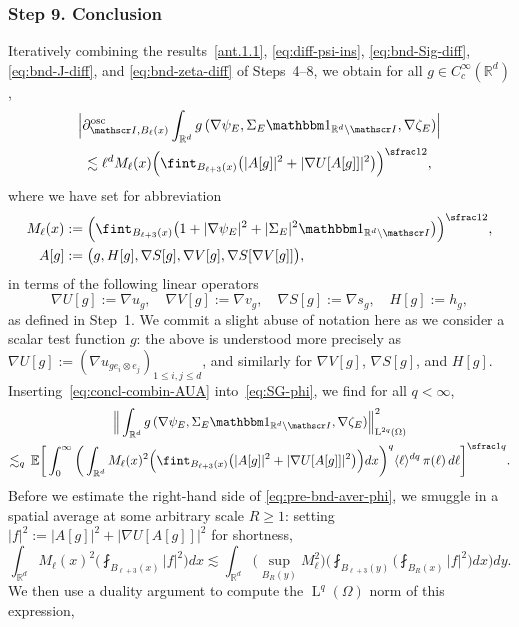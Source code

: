 \documentclass[10pt]{amsart}
\let\mathcal\mathscr
\let\mathds\mathbbm
\theoremstyle{plain}
\theoremstyle{definition}
\newcommand{\R}{\mathbb R}
\newcommand{\Ic}{\mathcal I}
\newcommand{\ee}{e}
\newcommand{\Ld}{\operatorname{L}}
\newcommand{\step}[1]{\subsubsection*{Step #1}}
\newcommand{\E}{\mathbb{E}}
\begin{document}
\step{9. Conclusion}
Iteratively combining the results~\eqref{ant.1.1}, \eqref{eq:diff-psi-ins}, \eqref{eq:bnd-Sig-diff}, \eqref{eq:bnd-J-diff}, and \eqref{eq:bnd-zeta-diff} of Steps~4--8,
we obtain for all $g\in C^\infty_c(\R^d)$,
\begin{multline}\label{eq:concl-combin-AUA}
\Big|\partial^{\operatorname{osc}}_{\Ic ,B_\ell(x)}\int_{\R^d}g\,(\nabla \psi_E,\Sigma_E\mathds1_{\R^d\setminus\Ic},\nabla\zeta_E)\Big|\\
\lesssim \ell^dM_\ell(x)\Big(\fint_{B_{\ell+3}(x)}\big(|A[g]|^2+|\nabla U [A[g]]|^2\big)\Big)^{\sfrac12},
\end{multline}
where we have set for abbreviation
\begin{align*}
M_\ell(x)&:= \Big(\fint_{B_{\ell+3}(x)}\big(1+|\nabla\psi_E|^2+|\Sigma_E|^2\mathds1_{\R^d\setminus\Ic}\big)\Big)^{\sfrac12},\\
A[g]&:= \big(g,H[g],\nabla S[g],\nabla V[g],\nabla S[\nabla V[g]]\big),
\end{align*}
in terms of the following linear operators
\[\nabla U[g]:=\nabla u_g,\quad \nabla V[g]:=\nabla v_g,\quad \nabla S[g]:=\nabla s_g,\quad H[g]:=h_g,\]
as defined in Step~1. We commit a slight abuse of notation here as we consider a scalar test function $g$: the above is understood more precisely as $\nabla U[g]:=(\nabla u_{g\ee_i\otimes\ee_j})_{1\le i,j\le d}$, and similarly for $\nabla V[g]$, $\nabla S[g]$, and $H[g]$.
Inserting~\eqref{eq:concl-combin-AUA} into~\eqref{eq:SG-phi}, we find for all $q<\infty$,
\begin{multline}\label{eq:pre-bnd-aver-phi}
\Big\|\int_{\R^d}g\,(\nabla \psi_E,\Sigma_E\mathds1_{\R^d\setminus\Ic},\nabla\zeta_E)\Big\|_{\Ld^{2q}(\Omega)}^{2}\\
\lesssim_q \,\E\bigg[\int_0^\infty\bigg(\int_{\R^d}M_\ell(x)^2\Big(\fint_{B_{\ell+3}(x)}\big(|A[g]|^2+|\nabla U [A[g]]|^2\big)\Big)dx\bigg)^q\langle\ell\rangle^{dq}\,\pi(\ell)\,d\ell\bigg]^{\sfrac1q}.
\end{multline}
Before we estimate the right-hand side of \eqref{eq:pre-bnd-aver-phi}, we smuggle in a spatial average at some arbitrary scale $R\ge1$: setting $|f|^2:=|A[g]|^2+|\nabla U [A[g]]|^2$ for shortness,
\begin{equation*}
\int_{\R^d}M_\ell(x)^2\Big(\fint_{B_{\ell+3}(x)} |f|^2\Big)dx
\lesssim \int_{\R^d}\Big(\sup_{B_R(y)}M_\ell^2\Big)\bigg(\fint_{B_{\ell+3}(y)}\Big(\fint_{B_{R}(x)}|f|^2\Big)dx\bigg)dy.
\end{equation*}
We then use a duality argument to compute the $\Ld^q(\Omega)$ norm of this expression,
\end{document}
